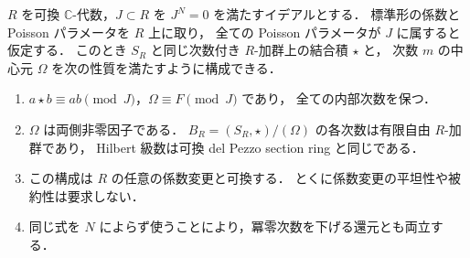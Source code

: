 \begin{theorem}[任意係数の中心商量子化]
\label{thm:nilpotent-universal-quantization}
$R$ を可換 $\mathbb C$-代数，$J\subset R$ を $J^N=0$ を満たすイデアルとする．
標準形の係数と Poisson パラメータを $R$ 上に取り，
全ての Poisson パラメータが $J$ に属すると仮定する．
このとき $S_R$ と同じ次数付き $R$-加群上の結合積 $\star$ と，
次数 $m$ の中心元 $\Omega$ を次の性質を満たすように構成できる．
\begin{enumerate}
\item $a\star b\equiv ab\pmod J$，$\Omega\equiv F\pmod J$ であり，
      全ての内部次数を保つ．
\item $\Omega$ は両側非零因子である．
      $B_R=(S_R,\star)/(\Omega)$ の各次数は有限自由 $R$-加群であり，
      Hilbert 級数は可換 del Pezzo section ring と同じである．
\item この構成は $R$ の任意の係数変更と可換する．
      とくに係数変更の平坦性や被約性は要求しない．
\item 同じ式を $N$ によらず使うことにより，冪零次数を下げる還元とも両立する．
\end{enumerate}
\end{theorem}


